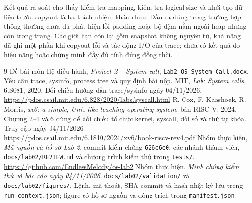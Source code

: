 \documentclass[12pt,a4paper]{article}
\newcommand{\code}[1]{\texttt{#1}}
\begin{document}
Kết quả rà soát cho thấy kiểm tra mapping, kiểm tra logical size và khởi tạo dữ liệu trước copyout là ba trách nhiệm khác nhau. Đầu ra đúng trong trường hợp thông thường chưa đủ phát hiện lỗi padding hoặc bộ đệm nằm ngoài heap nhưng còn trong trang. Các giới hạn còn lại gồm snapshot không nguyên tử, khả năng đã ghi một phần khi copyout lỗi và tác động I/O của trace; chưa có kết quả đo hiệu năng hoặc chứng minh đầy đủ tính đúng đồng thời.

{}
\begingroup\small\raggedright
\begin{thebibliography}{9}
\setlength{\itemsep}{7pt}
 Đề bài môn Hệ điều hành, \emph{Project 2 -- System call}, \code{Lab2\_OS\_System\_Call.docx}. Yêu cầu trace, sysinfo, process tree và quy định bài nộp.
 MIT, \emph{Lab: System calls}, 6.S081, 2020. Đối chiếu hướng dẫn trace/sysinfo ngày 04/11/2026.\\
\url{https://pdos.csail.mit.edu/6.828/2020/labs/syscall.html}
 R. Cox, F. Kaashoek, R. Morris, \emph{xv6: a simple, Unix-like teaching operating system}, bản RISC-V, 2024. Chương 2--4 và 6 dùng để đối chiếu tổ chức kernel, syscall, đối số và thứ tự khóa. Truy cập ngày 04/11/2026.\\
\url{https://pdos.csail.mit.edu/6.1810/2024/xv6/book-riscv-rev4.pdf}
 Nhóm thực hiện, \emph{Mã nguồn và hồ sơ Lab 2}, commit kiểm chứng \code{626c6e0}; các nhánh thành viên, \code{docs/lab02/REVIEW.md} và chương trình kiểm thử trong \code{tests/}.\\
\url{https://github.com/EndlessMelody/os-lab2}
 Nhóm thực hiện, \emph{Minh chứng kiểm thử và báo cáo ngày 04/11/2026}, \code{docs/lab02/validation/} và \code{docs/lab02/figures/}. Lệnh, mã thoát, SHA commit và hash nhật ký lưu trong \code{run-context.json}; figure có hồ sơ nguồn và dòng trích trong \code{manifest.json}.
\end{thebibliography}
\endgroup
\end{document}
